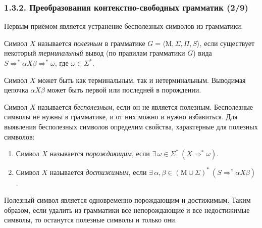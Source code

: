 \documentclass[mathserif,12pt,aspectratio=169]{beamer}
\renewcommand{\index}[1]{}
\def\odmkey#1#2{{\it\color{red} #1}\index{#2}}
\def\E#1#2{\exists\,#1\ \left(#2\right)}
\def\Mu{\mathrm{M}}
\begin{document}
\begin{frame}
\frametitle{1.3.2. Преобразования контекстно-свободных грамматик (2/9)}

Первым приёмом является устранение бесполезных символов из грамматики.

\smallskip
Символ $X$ называется 
\odmkey{полезным}{Символ!полезный} в грамматике 
$G=\langle{\Mu,\Sigma,\Pi,S}\rangle$, если существует некоторый 
\odmkey{терминальный}{Вывод!терминальный}
вывод (по правилам грамматики $G$) вида $S \Rightarrow^* \alpha X \beta \Rightarrow^* \omega$, 
где $\omega \in \Sigma^*$.

\begin{remark}
Символ $X$ может быть как терминальным,
так и нетерминальным.
Выводимая цепочка $ \alpha X \beta$ может быть первой или последней в порождении.
\end{remark}    

\smallskip
Символ $X$ называется \odmkey{бесполезным}{Символ!бесполезный}, если он не является полезным.
Бесполезные символы не нужны в грамматике, 
и от них можно и нужно избавиться.
Для выявления бесполезных символов определим свойства, характерные для полезных символов:

\begin{enumerate}
\item Символ $X$ называется  \odmkey{порождающим}{Символ!порождающий}, 
если $\E{\omega \in \Sigma^*}{X \Rightarrow^*\omega}$. 
\item Символ $X$ называется  \odmkey{достижимым}{Символ!достижимый}, если 
$\E{\alpha, \beta\in (\Mu\cup \Sigma)^*}{S \Rightarrow^* \alpha X \beta}$ .
\end{enumerate}

Полезный символ является одновременно порождающим и достижимым. Таким образом, если удалить из грамматики все непорождающие и все недостижимые символы, то останутся  полезные символы и только они.


\end{frame}
\end{document}

